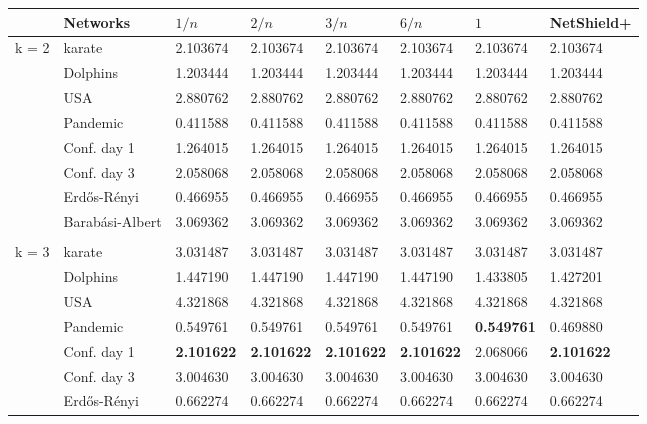 \documentclass[11pt]{article}
\theoremstyle{definition}
\begin{document}
\begin{table}
\begin{center}
        {\small
        \begin{tabular}{ | l | l | l | l | l | l | l | l | }
        \hline
                & Networks & $1/n$ & $2/n$ & $3/n$ & $6/n$ & $1$ & NetShield+ \\ \hline
                k = 2 & karate & 2.103674& 2.103674& 2.103674& 2.103674& 2.103674& 2.103674 \\ \hline
                & Dolphins & 1.203444& 1.203444& 1.203444& 1.203444& 1.203444& 1.203444 \\ \hline
                & USA & 2.880762& 2.880762& 2.880762& 2.880762& 2.880762& 2.880762 \\ \hline
                & Pandemic & 0.411588& 0.411588& 0.411588& 0.411588& 0.411588& 0.411588 \\ \hline
                & Conf. day 1 & 1.264015& 1.264015& 1.264015& 1.264015& 1.264015& 1.264015 \\ \hline
                & Conf. day 3 & 2.058068& 2.058068& 2.058068& 2.058068& 2.058068& 2.058068 \\ \hline
                & Erd\H{o}s-R\'enyi & 0.466955& 0.466955& 0.466955& 0.466955& 0.466955& 0.466955 \\ \hline
                & Barab\'asi-Albert & 3.069362& 3.069362& 3.069362& 3.069362& 3.069362& 3.069362 \\ \hline
                & & & & & & & \\ \hline
                k = 3 & karate & 3.031487& 3.031487& 3.031487& 3.031487& 3.031487& 3.031487 \\ \hline
                & Dolphins & 1.447190& 1.447190& 1.447190& 1.447190& 1.433805& 1.427201 \\ \hline
                & USA & 4.321868& 4.321868& 4.321868& 4.321868& 4.321868& 4.321868 \\ \hline
                & Pandemic & 0.549761& 0.549761& 0.549761& 0.549761& \textbf{0.549761} & 0.469880 \\ \hline
                & Conf. day 1 & \textbf{2.101622} & \textbf{2.101622} & \textbf{2.101622} & \textbf{2.101622} & 2.068066& \textbf{2.101622} \\ \hline
                & Conf. day 3 & 3.004630& 3.004630& 3.004630& 3.004630& 3.004630& 3.004630 \\ \hline
                & Erd\H{o}s-R\'enyi & 0.662274& 0.662274& 0.662274& 0.662274& 0.662274& 0.662274 \\ \hline

\end{tabular}}
\end{center}
\end{table}
\end{document}

